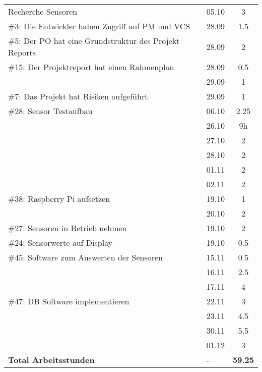 \documentclass[a4paper, 10pt, fleqn]{article}
\newcommand{\footer}{\midrule\textbf{Total Arbeitsstunden}&-&\textbf{59.25}\\\midrule\bottomrule}
\begin{document}
\begin{longtable}{p{9cm}|p{2cm}|c}
        Recherche Sensoren & 05.10 & 3\\
        \#3: Die Entwickler haben Zugriff auf PM und VCS& 28.09 & 1.5\\
        \#5: Der PO hat eine Grundstruktur des Projekt Reports& 28.09 & 2\\
        \#15: Der Projektreport hat einen Rahmenplan & 28.09 & 0.5\\
        & 29.09 & 1\\
        \#7: Das Projekt hat Risiken aufgeführt & 29.09 & 1\\
        \#28: Sensor Testaufbau & 06.10 & 2.25\\
        & 26.10 & 9h \\
        & 27.10 & 2\\
        & 28.10 & 2\\
        & 01.11 & 2\\
        & 02.11 & 2\\
        \#38: Raspberry Pi aufsetzen & 19.10 & 1\\
        & 20.10 & 2\\
        \#27: Sensoren in Betrieb nehmen & 19.10 & 2\\
        \#24: Sensorwerte auf Display & 19.10 & 0.5\\
        \#45: Software zum Auswerten der Sensoren & 15.11 & 0.5\\
        & 16.11 & 2.5\\
        & 17.11 & 4\\
        \#47: DB Software implementieren & 22.11 & 3\\
        & 23.11 & 4.5\\
        & 30.11 & 5.5\\
        & 01.12 & 3\\
        \footer
	\end{longtable}
\end{document}
